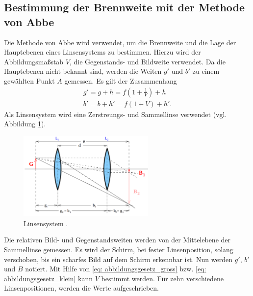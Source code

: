 \subsection{Bestimmung der Brennweite mit der Methode von Abbe}
Die Methode von Abbe wird verwendet, um die Brennweite und die Lage der Hauptebenen
eines Linsensystems zu bestimmen. Hierzu wird der Abbildungsmaßstab $V$,
die Gegenstands- und Bildweite verwendet. Da die Hauptebenen nicht bekannt sind,
werden die Weiten $g'$ und $b'$ zu einem gewählten Punkt $A$ gemessen.
Es gilt der Zusammenhang
\begin{align}
    g'=g+h=f\left(1+\frac{1}{V}\right)+h \label{eq: abstaende_abbe_g} \\
    b'=b+h'=f\left(1+V\right)+h' \label{eq: abstaende_abbe_b}.
\end{align}
Als Linsensystem wird eine Zerstreungs- und Sammellinse verwendet (vgl. Abbildung \ref{fig: linsensystem}). %
\begin{figure}
    \centering
    \includegraphics[width=0.6\textwidth]{./pics/linsensystem.png}
    \caption{Linsensystem \cite{anleitung408}.}
    \label{fig: linsensystem}
\end{figure}
Die relativen Bild- und Gegenstandsweiten werden von der Mittelebene
der Sammellinse gemessen.
Es wird der Schirm, bei fester Linsenposition, solang verschoben, bis ein scharfes
Bild auf dem Schirm erkennbar ist. Nun werden $g'$, $b'$ und $B$ notiert.
Mit Hilfe von \eqref{eq: abbildungsgesetz_gross} bzw. \eqref{eq: abbildungsgesetz_klein}
kann $V$ bestimmt werden.
Für zehn verschiedene Linsenpositionen, werden die Werte aufgeschrieben. %
